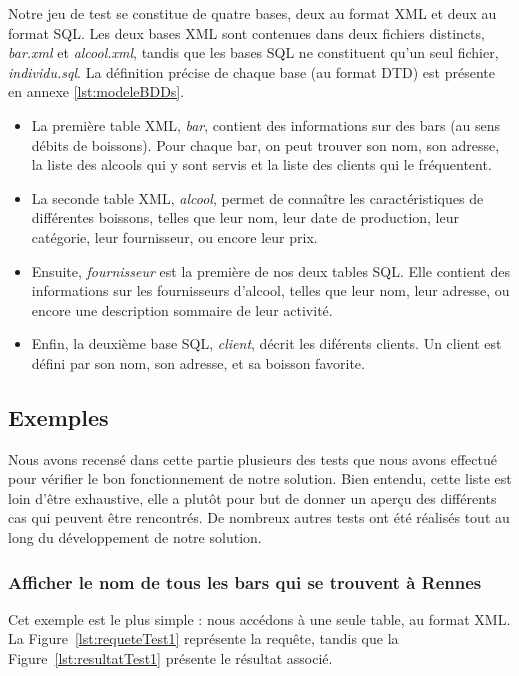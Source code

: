 \documentclass[a4paper,10pt]{article}
\newcommand{\fref}[1]{Figure~\ref{#1}}
\begin{document}
Notre jeu de test se constitue de quatre bases, deux au format XML et deux au format SQL. Les deux bases XML sont contenues dans deux fichiers distincts, \textit{bar.xml} et \textit{alcool.xml}, tandis que les bases SQL ne constituent qu'un seul fichier, \textit{individu.sql}. La définition précise de chaque base (au format DTD) est présente en annexe \ref{lst:modeleBDDs}.

\begin{itemize}
\item La première table XML, \textit{bar}, contient des informations sur des bars (au sens débits de boissons). Pour chaque bar, on peut trouver son nom, son adresse, la liste des alcools qui y sont servis et la liste des clients qui le fréquentent.
\item La seconde table XML, \textit{alcool}, permet de connaître les caractéristiques de différentes boissons, telles que leur nom, leur date de production, leur catégorie, leur fournisseur, ou encore leur prix.
\item Ensuite, \textit{fournisseur} est la première de nos deux tables SQL. Elle contient des informations sur les fournisseurs d'alcool, telles que leur nom, leur adresse, ou encore une description sommaire de leur activité.
\item Enfin, la deuxième base SQL, \textit{client}, décrit les diférents clients. Un client est défini par son nom, son adresse, et sa boisson favorite.
\end{itemize}


\subsection{Exemples}

Nous avons recensé dans cette partie plusieurs des tests que nous avons effectué pour vérifier le bon fonctionnement de notre solution. Bien entendu, cette liste est loin d'être exhaustive, elle a plutôt pour but de donner un aperçu des différents cas qui peuvent être rencontrés. De nombreux autres tests ont été réalisés tout au long du développement de notre solution.

\FloatBarrier
\subsubsection{Afficher le nom de tous les bars qui se trouvent à Rennes}

Cet exemple est le plus simple : nous accédons à une seule table, au format XML. La \fref{lst:requeteTest1} représente la requête, tandis que la \fref{lst:resultatTest1} présente le résultat associé.
\end{document}
